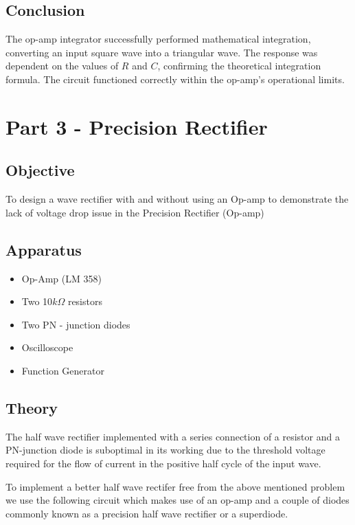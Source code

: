 \documentclass[a4paper,12pt]{article}
\begin{document}
\subsection{Conclusion}
The op-amp integrator successfully performed mathematical integration, converting an input square wave into a triangular wave. The response was dependent on the values of \( R \) and \( C \), confirming the theoretical integration formula. The circuit functioned correctly within the op-amp's operational limits.
\section{Part 3 - Precision Rectifier}
\subsection{Objective}
To design a wave rectifier with and without using an Op-amp to demonstrate the lack of voltage drop issue in the Precision Rectifier (Op-amp)

\subsection{Apparatus}
\begin{itemize}
\item Op-Amp (LM 358)
\item Two 10$k\Omega$ resistors
\item Two PN - junction diodes
\item Oscilloscope
\item Function Generator
\end{itemize}
\subsection{Theory}

The half wave rectifier implemented with a series connection of a resistor and a PN-junction diode is suboptimal in its working due to the threshold voltage required for the flow of current in the 
positive half cycle of the input wave. 

To implement a better half wave rectifer free from the above mentioned problem we use the following circuit which makes use of an op-amp and a couple of diodes commonly known as a precision half wave
rectifier or a superdiode.
\end{document}
